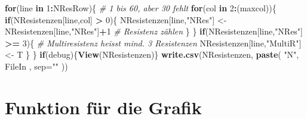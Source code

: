 \documentclass[
]{article}
\newenvironment{Shaded}{\begin{snugshade}}{\end{snugshade}}
\newcommand{\CommentTok}[1]{\textcolor[rgb]{0.56,0.35,0.01}{\textit{#1}}}
\newcommand{\ControlFlowTok}[1]{\textcolor[rgb]{0.13,0.29,0.53}{\textbf{#1}}}
\newcommand{\DataTypeTok}[1]{\textcolor[rgb]{0.13,0.29,0.53}{#1}}
\newcommand{\DecValTok}[1]{\textcolor[rgb]{0.00,0.00,0.81}{#1}}
\newcommand{\KeywordTok}[1]{\textcolor[rgb]{0.13,0.29,0.53}{\textbf{#1}}}
\newcommand{\NormalTok}[1]{#1}
\newcommand{\OperatorTok}[1]{\textcolor[rgb]{0.81,0.36,0.00}{\textbf{#1}}}
\newcommand{\StringTok}[1]{\textcolor[rgb]{0.31,0.60,0.02}{#1}}
\begin{document}
\begin{Shaded}
\begin{Highlighting}[]
\ControlFlowTok{for}\NormalTok{(line }\ControlFlowTok{in} \DecValTok{1}\OperatorTok{:}\NormalTok{NResRow)\{                }\CommentTok{# 1 bis 60, aber 30 fehlt}
  \ControlFlowTok{for}\NormalTok{(col }\ControlFlowTok{in} \DecValTok{2}\OperatorTok{:}\NormalTok{(maxcol))\{}
    \ControlFlowTok{if}\NormalTok{(NResistenzen[line,col] }\OperatorTok{>}\StringTok{ }\DecValTok{0}\NormalTok{)\{}
\NormalTok{      NResistenzen[line,}\StringTok{"NRes"}\NormalTok{] <-}\StringTok{ }\NormalTok{NResistenzen[line,}\StringTok{"NRes"}\NormalTok{]}\OperatorTok{+}\DecValTok{1}  \CommentTok{# Resistenz zählen}
\NormalTok{    \}}
\NormalTok{  \}}
  \ControlFlowTok{if}\NormalTok{(NResistenzen[line,}\StringTok{"NRes"}\NormalTok{] }\OperatorTok{>=}\StringTok{ }\DecValTok{3}\NormalTok{)\{  }\CommentTok{# Multiresistenz heisst mind. 3 Resistenzen}
\NormalTok{    NResistenzen[line,}\StringTok{"MultiR"}\NormalTok{] <-}\StringTok{ }\NormalTok{T}
\NormalTok{  \}}
\NormalTok{\}}
\ControlFlowTok{if}\NormalTok{(debug)\{}\KeywordTok{View}\NormalTok{(NResistenzen)\}}
\KeywordTok{write.csv}\NormalTok{(NResistenzen, }\KeywordTok{paste}\NormalTok{( }\StringTok{"N"}\NormalTok{, FileIn , }\DataTypeTok{sep=}\StringTok{""}\NormalTok{ ))}
\end{Highlighting}
\end{Shaded}

\hypertarget{funktion-fuxfcr-die-grafik}{%
\section{Funktion für die Grafik}\label{funktion-fuxfcr-die-grafik}}
\end{document}

